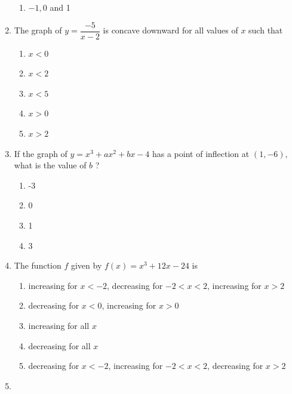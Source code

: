 \documentclass{article}
\begin{document}
\begin{enumerate}
\begin{minipage}[t]{\linewidth}
\begin{enumerate}
			\item \(-1,0\) and 1
		\end{enumerate}
	\end{minipage}
	\item
	\begin{minipage}[t]{\linewidth}
		The graph of \(y=\dfrac{-5}{x-2}\) is concave downward for all values of
\(x\) such that
\vspace{1em}
		\begin{enumerate}
		\itemsep1em
			\item \(x<0\)
			\item \(x<2\)
			\item \(x<5\)
			\item \(x>0\)
			\item \(x>2\)
		\end{enumerate}
	\end{minipage}
	\item
	\begin{minipage}[t]{\linewidth}
		If the graph of \(y=x^{3}+a x^{2}+b x-4\) has a point of inflection at
\((1,-6)\), what is the value of \(b\) ?
\vspace{1em}
		\begin{enumerate}
		\itemsep1em
			\item -3
			\item 0
			\item 1
			\item 3
		\end{enumerate}
	\end{minipage}
	\item
	\begin{minipage}[t]{\linewidth}
		The function \(f\) given by \(f(x)=x^{3}+12 x-24\) is
\vspace{1em}
		\begin{enumerate}
		\itemsep1em
			\item increasing for \(x<-2\), decreasing for \(-2<x<2\), increasing for
\(x>2\)
			\item decreasing for \({x}<0\), increasing for \({x}>0\)
			\item increasing for all \(x\)
			\item decreasing for all \(x\)
			\item decreasing for \({x}<-2\), increasing for \(-2<{x}<2\), decreasing for
\({x}>2\)
		\end{enumerate}
	\end{minipage}
	\item
	\begin{minipage}[t]{\linewidth}

\end{minipage}
\end{enumerate}
\end{document}
